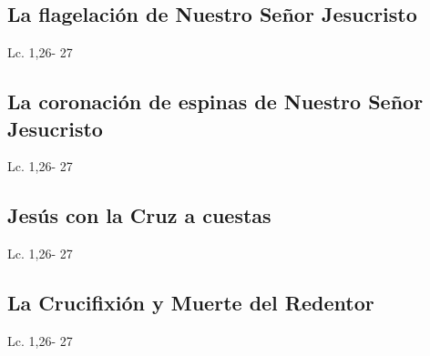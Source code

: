 \documentclass[a4paper,11pt,sans]{article}
\begin{document}
    \subsection*{\hfil La flagelación de Nuestro Señor Jesucristo \hfil}
        
      \begin{multicols}{2}

      \columnbreak
           
      \end{multicols}
      \begin{center}
        Lc. 1,26- 27           
      \end{center}
    \subsection*{\hfil La coronación de espinas de Nuestro Señor Jesucristo \hfil}
      \begin{multicols}{2}

      \columnbreak
           
      \end{multicols}
      \begin{center}
         Lc. 1,26- 27           
      \end{center}
    \subsection*{\hfil Jesús con la Cruz a cuestas \hfil}
      \begin{multicols}{2}

      \columnbreak
           
      \end{multicols}
      \begin{center}
        Lc. 1,26- 27           
      \end{center}
    \subsection*{\hfil La Crucifixión y Muerte del Redentor \hfil}
      \begin{multicols}{2}

      \columnbreak
           
      \end{multicols}
      \begin{center}
         Lc. 1,26- 27           
      \end{center}
         
    \newpage
         
\end{document}
